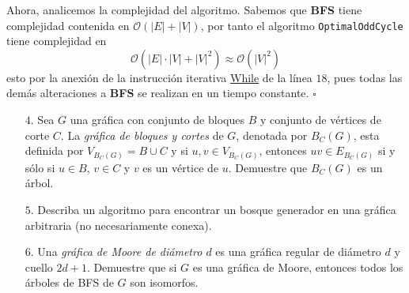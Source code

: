 \documentclass{article}
\newcommand{\code}[1]{\textcolor{white!25!black}{\texttt{#1}}}
\begin{document}
Ahora, analicemos la complejidad del algoritmo. Sabemos que \textbf{BFS}
tiene complejidad contenida en $\mathcal{O}(|E| + |V|)$, por tanto el
algoritmo \code{OptimalOddCycle} tiene complejidad en
\[
\mathcal{O}(|E|\cdot|V| + |V|^2) \approx \mathcal{O}(|V|^2)
\]
esto por la anexi\'on de la instrucci\'on iterativa \underline{While} de
la l\'inea $18$, pues todas las dem\'as alteraciones a \textbf{BFS} se
realizan en un tiempo constante.
\hfill $\square$
\begin{enumerate}
\item[$4$.] Sea $G$ una gr\'afica con conjunto de bloques $B$ y conjunto de
  v\'ertices de corte $C$.   La {\em gr\'afica de bloques y cortes} de $G$,
  denotada por $B_C (G)$, esta definida por $V_{B_C (G)} = B \cup C$ y
  si $u, v \in V_{B_C (G)}$, entonces $uv \in E_{B_C (G)}$ si y s\'olo si
  $u \in B$, $v \in C$ y $v$ es un v\'ertice de $u$.   Demuestre que
  $B_C (G)$ es un \'arbol.
  
\item[$5$.] Describa un algoritmo para encontrar un bosque generador en una
  gr\'afica arbitraria (no necesariamente conexa).
  
\item[$6$.] Una {\em gr\'afica de Moore de di\'ametro $d$} es una gr\'afica
  regular de di\'ametro $d$ y cuello $2d+1$.   Demuestre que si $G$ es
  una gr\'afica de Moore, entonces todos los \'arboles de BFS de $G$
  son isomorfos.

\end{enumerate}
\end{document}
